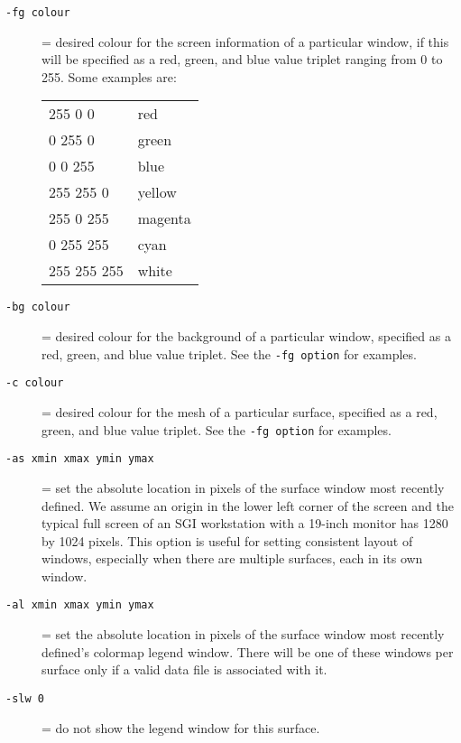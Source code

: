 \begin{description}
  \item[{\tt-fg colour}]
    = desired colour for the screen information of a particular 
    window, if this will be   
    specified as a red, green, and blue value triplet ranging from 
    0 to 255.  Some examples are:\\
    \begin{center}
        \begin{tabular}{|l|l|} \hline
            255 0 0     & red \\
            0 255 0     & green\\
            0 0 255     & blue\\
            255 255 0   & yellow\\
            255 0 255   & magenta  \\
            0 255 255   & cyan \\
            255 255 255 & white  \\ \hline
        \end{tabular}
    \end{center}
    
  \item[{\tt-bg colour}]
    = desired colour for the background of a particular window,
    specified as a red, green, and blue value triplet.  
    See the {\tt-fg option} for examples.
    
  \item[{\tt-c colour}]
    = desired colour for the mesh of a particular surface,
    specified as a red, green, and blue value triplet.  
    See the {\tt-fg option} for examples.
    
    
  \item[{\tt-as xmin xmax ymin ymax}] = set the absolute location in
    pixels of the surface window most recently defined.  We
    assume an origin in the lower left corner of the screen and
    the typical full screen of an SGI workstation with a 19-inch
    monitor has 1280 by 1024 pixels.  This option is useful for
    setting consistent layout of windows, especially when
    there are multiple surfaces, each in its own window.
    
  \item[{\tt-al xmin xmax ymin ymax}] = set the absolute location in 
    pixels of the surface window most recently defined's colormap
    legend window.  There will be one of these windows per
    surface only if a valid data file is associated with it.
    
  \item[{\tt -slw 0}] = do not show the legend window for this surface.


\end{description}
